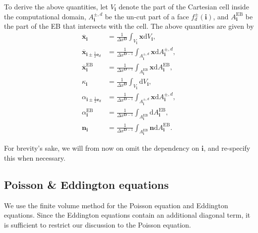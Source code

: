 \documentclass[3p]{elsarticle}
\def\diff{\ensuremath{\text{d}}}
\begin{document}
To derive the above quantities, let $V_{\bm{i}}$ denote the part of the Cartesian cell inside the computational domain, $A_{\bm{i}}^{\pm, d}$ be the un-cut part of a face $f^{\pm}_d(\bm{i})$, and $A_{\bm{i}}^{\text{EB}}$ be the part of the EB that intersects with the cell. The above quantities are given by
\begin{subequations}
  \begin{align}
    \overline{\bm{x}}_{\bm{i}} &= \frac{1}{\Delta x^{\bm{D}}}\int_{V_{\bm{i}}}\bm{x}\diff V_{\bm{i}},\\
    \overline{\bm{x}}_{\bm{i}\pm\frac{1}{2}\bm{e}_d} &= \frac{1}{\Delta x^{\bm{D}-1}}\int_{A_{\bm{i}}^{\pm, d}}\bm{x}\diff A_{\bm{i}}^{\pm, d},\\
    \overline{\bm{x}}_{\bm{i}}^{\text{EB}} &= \frac{1}{\Delta x^{\bm{D}-1}}\int_{A_{\bm{i}}^{\text{EB}}}\bm{x}\diff A_{\bm{i}}^{\text{EB}}, \\
    \kappa_{\bm{i}} &= \frac{1}{\Delta x^{\bm{D}}}\int_{V_{\bm{i}}}\diff V_{\bm{i}},\\
    \alpha_{\bm{i}\pm\frac{1}{2}\bm{e}_d} &= \frac{1}{\Delta x^{\bm{D}-1}}\int_{A_{\bm{i}}^{\pm, d}}\bm{x}\diff A_{\bm{i}}^{\pm, d},\\
    \alpha_{\bm{i}}^{\text{EB}} &= \frac{1}{\Delta x^{\bm{D}-1}}\int_{A_{\bm{i}}^{\text{EB}}}\diff A_{\bm{i}}^{\text{EB}}, \\
    \bm{n}_{\bm{i}} &= \frac{1}{\Delta x^{\bm{D}-1}}\int_{A_{\bm{i}}^{\text{EB}}}\bm{n}\diff A_{\bm{i}}^{\text{EB}}.
  \end{align}
\end{subequations}

For brevity's sake, we will from now on omit the dependency on $\bm{i}$, and re-specify this when necessary. 

\subsection{Poisson \& Eddington equations}
\label{sec:poisson}
We use the finite volume method for the Poisson equation and Eddington equations. Since the Eddington equations contain an additional diagonal term, it is sufficient to restrict our discussion to the Poisson equation.
\end{document}
